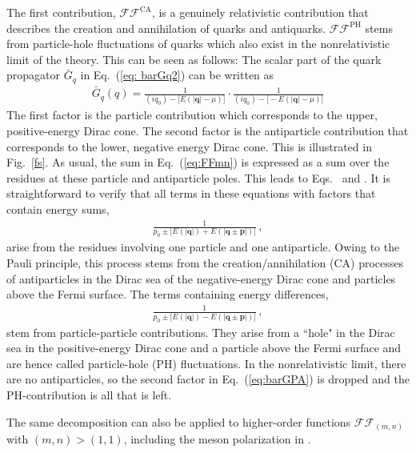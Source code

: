 \documentclass[reprint,english,superscriptaddress,preprintnumbers,amsmath,amssymb,aps,prd,nofootinbib]{revtex4-2}
\newcommand{\bs}[1]{\boldsymbol{#1}}
\def\Eq#1{Eq.~(\ref{#1})}
\def\Fig#1{Fig.~\ref{#1}}
\begin{document}
The first contribution, $\mathcal{FF}^{\mathrm{CA}}$, is a genuinely relativistic contribution that describes the creation and annihilation of quarks and antiquarks. 
$\mathcal{FF}^{\mathrm{PH}}$ stems from particle-hole fluctuations of quarks which also exist in the nonrelativistic limit of the theory.
This can be seen as follows: The scalar part of the quark propagator $\bar G_q$ in \Eq{eq: barGq2} can be written as
\begin{align}\label{eq:barGPA}
    \bar G_q(q) = \frac{1}{(iq_0)-\big[ E(|\bs{q}|-\mu) \big]}\cdot\frac{1}{(iq_0)-\big[ -E(|\bs{q}|-\mu) \big]}
\end{align}
The first factor is the particle contribution which corresponds to the upper, positive-energy Dirac cone. The second factor is the antiparticle contribution that corresponds to the lower, negative energy Dirac cone. This is illustrated in \Fig{fs}. As usual, the sum in \Eq{eq:FFmn} is expressed as a sum over the residues at these particle and antiparticle poles. This leads to Eqs.\  and . 
It is straightforward to verify that all terms in these equations with factors that contain energy sums,
\begin{align}
    \frac{1}{p_0\pm\big[ E(|\bs{q}|) +E(|\bs{q}\pm\bs{p}|) \big]}\,,
\end{align}
arise from the residues involving one particle and one antiparticle. Owing to the Pauli principle, this process stems from the creation/annihilation (CA) processes of antiparticles in the Dirac sea of the negative-energy Dirac cone and particles above the Fermi surface. The terms containing energy differences, 
\begin{align}
    \frac{1}{p_0\pm\big[ E(|\bs{q}|) -E(|\bs{q}\pm\bs{p}|) \big]}\,,
\end{align}
stem from particle-particle contributions. They arise from a ``hole" in the Dirac sea in the positive-energy Dirac cone and a particle above the Fermi surface and are hence called particle-hole (PH) fluctuations. In the nonrelativistic limit, there are no antiparticles, so the second factor in \Eq{eq:barGPA} is dropped and the PH-contribution is all that is left. 

The same decomposition can also be applied to higher-order functions $\mathcal{FF}_{(m,n)}$ with $(m,n) > (1,1)$, including the meson polarization in . 
\end{document}
